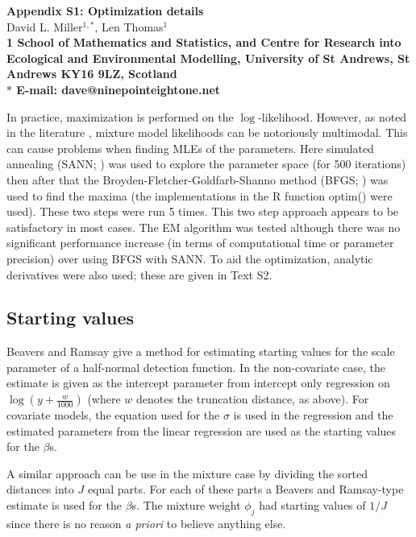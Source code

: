 \documentclass[10pt]{article}
\date{}
\begin{document}
\begin{flushleft}
{\Large
\textbf{Appendix S1: Optimization details}
}
\\
David L. Miller$^{1,\ast}$,
Len Thomas$^{1}$
\\
\bf{1} School of Mathematics and Statistics, and Centre for Research into Ecological and Environmental Modelling, University of St Andrews, St Andrews KY16 9LZ, Scotland
\\
$\ast$ E-mail: dave@ninepointeightone.net
\end{flushleft}

In practice, maximization is performed on the $\log$-likelihood. However, as noted in the literature \cite{Gelman:2013tc, Marin:2005wf}, mixture model likelihoods can be notoriously multimodal. This can cause problems when finding MLEs of the parameters. Here simulated annealing (SANN; \cite[Chapter 10]{Press:1990tn}) was used to explore the parameter space (for 500 iterations) then after that the Broyden-Fletcher-Goldfarb-Shanno method (BFGS; \cite[Chapter 10]{Press:1990tn}) was used to find the maxima (the implementations in the R function optim() were used). These two steps were run 5 times. This two step approach appears to be satisfactory in most cases. The EM algorithm \cite{Dempster:1977ul} was tested although there was no significant performance increase (in terms of computational time or parameter precision) over using BFGS with SANN. To aid the optimization, analytic derivatives were also used; these are given in Text S2.

\subsection*{Starting values}

Beavers and Ramsay \cite{Beavers:1998wk} give a method for estimating starting values for the scale parameter of a half-normal detection function. In the non-covariate case, the estimate is given as the intercept parameter from intercept only regression on $\log(y+\frac{w}{1000})$ (where $w$ denotes the truncation distance, as above). For covariate models, the equation used for the $\sigma$ is used in the regression and the estimated parameters from the linear regression are used as the starting values for the $\beta$s.

A similar approach can be use in the mixture case by dividing the sorted distances into $J$ equal parts. For each of these parts a Beavers and Ramsay-type estimate is used for the $\beta$s. The mixture weight $\phi_j$ had starting values of $1/J$ since there is no reason \textit{a priori} to believe anything else.
\end{document}

